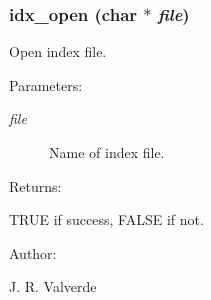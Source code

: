 \subsubsection{ idx\_\-open (char $\ast$ {\em file})}\label{P__db_8h_a7}


Open index file.



 \begin{Desc}
\item[Parameters: ]\par
\begin{description}
\item[{\em 
file}]Name of index file.\end{description}
\end{Desc}
\begin{Desc}
\item[Returns: ]\par
TRUE if success, FALSE if not.\end{Desc}
\begin{Desc}
\item[Author: ]\par
J. R. Valverde \end{Desc}
